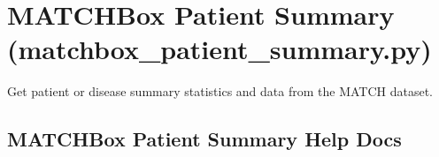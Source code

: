 \documentclass[letterpaper,10pt,english]{sphinxmanual}
\begin{document}
\section{MATCHBox Patient Summary (matchbox\_patient\_summary.py)}
\label{\detokenize{helper_scripts:matchbox-patient-summary-matchbox-patient-summary-py}}
Get patient or disease summary statistics and data from the MATCH dataset.


\subsection{MATCHBox Patient Summary Help Docs}
\label{\detokenize{helper_scripts:matchbox-patient-summary-help-docs}}
%
\begin{sphinxVerbatim}[commandchars=\\\{\}]
 \PYG{p}{[}\PYG{p}{]} \PYG{p}{[} \PYG{p}{]} \PYG{p}{[} \PYG{p}{]} \PYG{p}{[} \PYG{p}{]}
\PYG{p}{[} \PYG{p}{]} \PYG{p}{[}\PYG{p}{]} \PYG{p}{[} \PYG{p}{]} \PYG{p}{[}\PYG{p}{]} 

 
               


\end{sphinxVerbatim}
\end{document}
